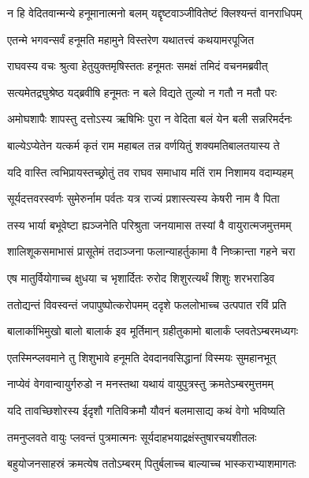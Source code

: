 \twolineshloka
{न हि वेदितवान्मन्ये हनूमानात्मनो बलम्}
{यद्दृष्टवाञ्जीवितेष्टं क्लिश्यन्तं वानराधिपम्} %

\twolineshloka
{एतन्मे भगवन्सर्वं हनूमति महामुने}
{विस्तरेण यथातत्त्वं कथयामरपूजित} %

\twolineshloka
{राघवस्य वचः श्रुत्वा हेतुयुक्तमृषिस्ततः}
{हनूमतः समक्षं तमिदं वचनमब्रवीत्} %

\twolineshloka
{सत्यमेतद्रघुश्रेष्ठ यद्ब्रवीषि हनूमतः}
{न बले विद्यते तुल्यो न गतौ न मतौ परः} %

\twolineshloka
{अमोघशापैः शापस्तु दत्तोऽस्य ऋषिभिः पुरा}
{न वेदिता बलं येन बली सन्नरिमर्दनः} %

\twolineshloka
{बाल्येऽप्येतेन यत्कर्म कृतं राम महाबल}
{तन्न वर्णयितुं शक्यमतिबालतयास्य ते} %

\twolineshloka
{यदि वास्ति त्वभिप्रायस्तच्छ्रोतुं तव राघव}
{समाधाय मतिं राम निशामय वदाम्यहम्} %

\twolineshloka
{सूर्यदत्तवरस्वर्णः सुमेरुर्नाम पर्वतः}
{यत्र राज्यं प्रशास्त्यस्य केषरी नाम वै पिता} %

\twolineshloka
{तस्य भार्या बभूवेष्टा ह्यञ्जनेति परिश्रुता}
{जनयामास तस्यां वै वायुरात्मजमुत्तमम्} %

\twolineshloka
{शालिशूकसमाभासं प्रासूतेमं तदाञ्जना}
{फलान्याहर्तुकामा वै निष्क्रान्ता गहने चरा} %

\twolineshloka
{एष मातुर्वियोगाच्च क्षुधया च भृशार्दितः}
{रुरोद शिशुरत्यर्थं शिशुः शरभराडिव} %

\twolineshloka
{ततोद्यन्तं विवस्वन्तं जपापुष्पोत्करोपमम्}
{ददृशे फललोभाच्च उत्पपात रविं प्रति} %

\twolineshloka
{बालार्काभिमुखो बालो बालार्क इव मूर्तिमान्}
{ग्रहीतुकामो बालार्कं प्लवतेऽम्बरमध्यगः} %

\twolineshloka
{एतस्मिन्प्लवमाने तु शिशुभावे हनूमति}
{देवदानवसिद्धानां विस्मयः सुमहानभूत्} %

\twolineshloka
{नाप्येवं वेगवान्वायुर्गरुडो न मनस्तथा}
{यथायं वायुपुत्रस्तु क्रमतेऽम्बरमुत्तमम्} %

\twolineshloka
{यदि तावच्छिशोरस्य ईदृशौ गतिविक्रमौ}
{यौवनं बलमासाद्य कथं वेगो भविष्यति} %

\twolineshloka
{तमनुप्लवते वायुः प्लवन्तं पुत्रमात्मनः}
{सूर्यदाहभयाद्रक्षंस्तुषारचयशीतलः} %

\twolineshloka
{बहुयोजनसाहस्रं क्रमत्येष ततोऽम्बरम्}
{पितुर्बलाच्च बाल्याच्च भास्कराभ्याशमागतः} %

